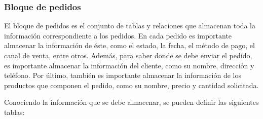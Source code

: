 \subsubsection{Bloque de pedidos}

El bloque de pedidos es el conjunto de tablas y relaciones que almacenan toda la información correspondiente a los pedidos. En cada pedido es importante almacenar la información de éste, como el estado, la fecha, el método de pago, el canal de venta, entre otros. Además, para saber donde se debe enviar el pedido, es importante almacenar la información del cliente, como su nombre, dirección y teléfono. Por último, también es importante almacenar la información de los productos que componen el pedido, como su nombre, precio y cantidad solicitada.

Conociendo la información que se debe almacenar, se pueden definir las siguientes tablas:

